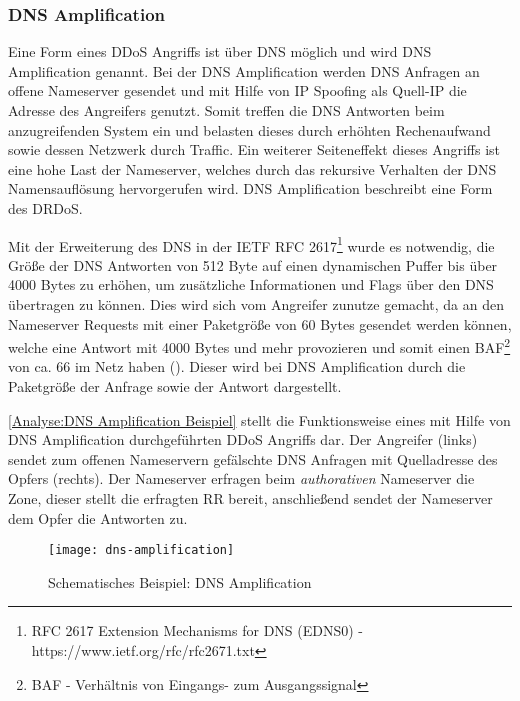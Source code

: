 \subsubsection{\ac{DNS} Amplification}
\label{Analyse:DNS Amplification}
Eine Form eines \ac{DDoS} Angriffs ist über \ac{DNS} möglich und wird \ac{DNS} Amplification genannt. Bei der \ac{DNS} Amplification werden \ac{DNS} Anfragen an offene Nameserver gesendet und mit Hilfe von \ac{IP} Spoofing als Quell-\ac{IP} die Adresse des Angreifers genutzt. Somit treffen die \ac{DNS} Antworten beim anzugreifenden System ein und belasten dieses durch erhöhten Rechenaufwand sowie dessen Netzwerk durch Traffic. Ein weiterer Seiteneffekt dieses Angriffs ist eine hohe Last der Nameserver, welches durch das rekursive Verhalten der \ac{DNS} Namensauflösung hervorgerufen wird. \ac{DNS} Amplification beschreibt eine Form des \ac{DRDoS}.

Mit der Erweiterung des \ac{DNS} in der \ac{IETF} \ac{RFC} 2617\footnote{RFC 2617 Extension Mechanisms for DNS (EDNS0) - https://www.ietf.org/rfc/rfc2671.txt} wurde es notwendig, die Größe der \ac{DNS} Antworten von 512 Byte auf einen dynamischen Puffer bis über 4000 Bytes zu erhöhen, um zusätzliche Informationen und Flags über den \ac{DNS} übertragen zu können. Dies wird sich vom Angreifer zunutze gemacht, da an den Nameserver Requests mit einer Paketgröße von 60 Bytes gesendet werden können, welche eine Antwort mit 4000 Bytes und mehr provozieren und somit einen \ac{BAF}\footnote{BAF - Verhältnis von Eingangs- zum Ausgangssignal} von ca. 66 im Netz haben (\cite{Ledermueller2009}). Dieser wird bei \ac{DNS} Amplification durch die Paketgröße der Anfrage sowie der Antwort dargestellt.

\autoref{Analyse:DNS Amplification Beispiel} stellt die Funktionsweise eines mit Hilfe von \ac{DNS} Amplification durchgeführten \ac{DDoS} Angriffs dar. Der Angreifer (links) sendet zum offenen Nameservern gefälschte \ac{DNS} Anfragen mit Quelladresse des Opfers (rechts). Der Nameserver erfragen beim \textit{authorativen} Nameserver die Zone, dieser stellt die erfragten \ac{RR} bereit, anschließend sendet der Nameserver dem Opfer die Antworten zu.

\begin{figure}[h]
    \centering
    \texttt{[image: dns-amplification]}
    \caption{Schematisches Beispiel: DNS Amplification}
    \label{Analyse:DNS Amplification Beispiel}
\end{figure}


